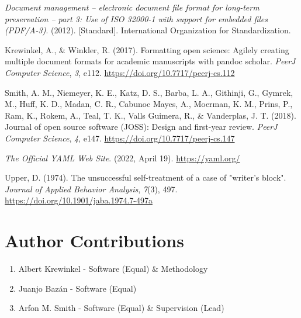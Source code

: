 \documentclass[
]{article}
\newlength{\cslhangindent}
\newlength{\cslentryspacingunit} %
\newenvironment{CSLReferences}[2] %
 {%
  \setlength{\parindent}{0pt}
  \ifodd #1
  \let\oldpar\par
  \def\par{\hangindent=\cslhangindent\oldpar}
  \fi
  \setlength{\parskip}{#2\cslentryspacingunit}
 }%
 {}
\begin{document}
\hypertarget{refs}{}
\begin{CSLReferences}{1}{0}
\leavevmode{}%
\emph{Document management -- electronic document file format for
long-term preservation -- part 3: Use of {ISO} 32000-1 with support for
embedded files ({PDF/A-3})}. (2012). {[}Standard{]}. International
Organization for Standardization.

\leavevmode{}%
Krewinkel, A., \& Winkler, R. (2017). Formatting open science: Agilely
creating multiple document formats for academic manuscripts with pandoc
scholar. \emph{PeerJ Computer Science}, \emph{3}, e112.
\url{https://doi.org/10.7717/peerj-cs.112}

\leavevmode{}%
Smith, A. M., Niemeyer, K. E., Katz, D. S., Barba, L. A., Githinji, G.,
Gymrek, M., Huff, K. D., Madan, C. R., Cabunoc Mayes, A., Moerman, K.
M., Prins, P., Ram, K., Rokem, A., Teal, T. K., Valls Guimera, R., \&
Vanderplas, J. T. (2018). Journal of open source software (JOSS): Design
and first-year review. \emph{PeerJ Computer Science}, \emph{4}, e147.
\url{https://doi.org/10.7717/peerj-cs.147}

\leavevmode{}%
\emph{The {Official YAML Web Site}}. (2022, April 19).
\url{https://yaml.org/}

\leavevmode{}%
Upper, D. (1974). The unsuccessful self-treatment of a case of "writer's
block". \emph{Journal of Applied Behavior Analysis}, \emph{7}(3), 497.
\url{https://doi.org/10.1901/jaba.1974.7-497a}

\end{CSLReferences}

\section{Author Contributions}\label{author-contributions}
\begin{enumerate}
\item Albert Krewinkel - Software (Equal) & Methodology
\item Juanjo Bazán - Software (Equal)
\item Arfon M. Smith - Software (Equal) & Supervision (Lead)
\end{enumerate}
\end{document}
